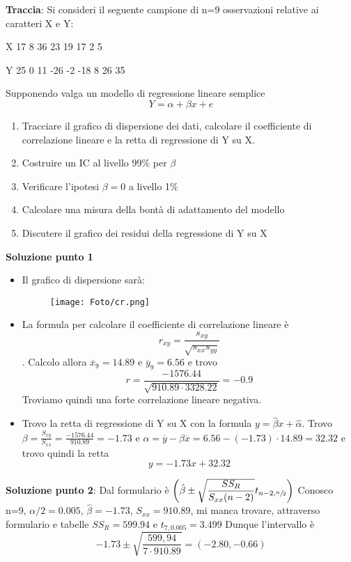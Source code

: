 \textbf{Traccia}: Si consideri il seguente campione di n=9 osservazioni relative ai caratteri X e Y:
\begin{center}
    \item X  17 8 36 23 19 17 2 5
    \item Y 25 0 11 -26 -2 -18 8 26 35
\end{center}
Supponendo valga un modello di regressione lineare semplice $$Y = \alpha + \beta x + e$$
\begin{enumerate}
    \item Tracciare il grafico di dispersione dei dati, calcolare il coefficiente di correlazione lineare e la retta di regressione di Y su X.
    \item Costruire un IC al livello 99\% per $\beta$
    \item Verificare l'ipotesi $\beta=0$ a livello 1\% 
    \item Calcolare una misura della bontà di adattamento del modello
    \item Discutere il grafico dei residui della regressione di Y su X
\end{enumerate}

\ind \textbf{Soluzione punto 1} 
\begin{itemize}
    \item Il grafico di dispersione sarà: 
        \begin{figure}[H]
            \centering
            \texttt{[image: Foto/cr.png]}
        \end{figure}
    \item La formula per calcolare il coefficiente di correlazione lineare è $$r_{xy}= \dfrac{s_{xy}}{\sqrt{s_{xx}s_{yy}}}$$. Calcolo allora $\overline{x}_9= 14.89$ e $\overline{y}_9= 6.56 $ e trovo $$r = \dfrac{-1576.44}{\sqrt{910.89 \cdot 3328.22}} = - 0.9$$ Troviamo quindi una forte correlazione lineare negativa.
    \item Trovo la retta di regressione di Y su X con la formula $y = \hat{\beta}x + \hat{\alpha}$. Trovo $\beta = \frac{S_{xy}}{S_{xx}} = \frac{-1576.44}{910.89} = -1.73$ e $\alpha = \overline{y} - \hat{\beta}\overline{x} = 6.56 - (-1.73) \cdot 14.89 = 32.32$ e trovo quindi la retta $$y=  -1.73x + 32.32$$
\end{itemize}

\ind \textbf{Soluzione punto 2}: Dal formulario è $ \left( \hat{\beta} \pm \sqrt{\dfrac{SS_R}{S_{xx}(n-2)}} t_{n-2, \sfrac{\alpha}{2}} \right)$ Conosco n=9, $\alpha/2 = 0.005$, $\hat{\beta}= -1.73$, $S_{xx} = 910.89$, mi manca trovare, attraverso formulario e tabelle $SS_R=599.94$ e $t_{7, 0.005}=3.499$ Dunque l'intervallo è $$-1.73 \pm \sqrt{\dfrac{599,94}{7 \cdot 910.89}} = (-2.80, -0.66)$$

